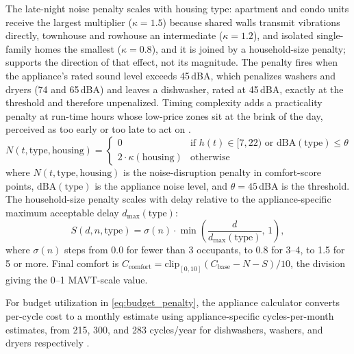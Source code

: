 \documentclass[final,3p,times]{elsarticle}
\begin{document}
The late-night noise penalty scales with housing type: apartment and condo units receive the largest multiplier ($\kappa=1.5$) because shared walls transmit vibrations directly, townhouse and rowhouse an intermediate ($\kappa=1.2$), and isolated single-family homes the smallest ($\kappa=0.8$), and it is joined by a household-size penalty; \citet{waseem2020} supports the direction of that effect, not its magnitude. The penalty fires when the appliance's rated sound level exceeds 45\,dBA, which penalizes washers and dryers (74 and 65\,dBA) and leaves a dishwasher, rated at 45\,dBA, exactly at the threshold and therefore unpenalized. Timing complexity adds a practicality penalty at run-time hours whose low-price zones sit at the brink of the day, perceived as too early or too late to act on \cite{paetz2012}.
\begin{equation}
  N(t,\mathrm{type},\mathrm{housing})=
  \begin{cases}
    0 & \text{if } h(t)\in[7,22) \text{ or } \mathrm{dBA}(\mathrm{type})\le \theta \\[3pt]
    2\cdot \kappa(\mathrm{housing}) & \text{otherwise}
  \end{cases}
  \label{eq:appliance_noise_penalty}
\end{equation}
\noindent where $N(t,\mathrm{type},\mathrm{housing})$ is the noise-disruption penalty in comfort-score points, $\mathrm{dBA}(\mathrm{type})$ is the appliance noise level, and $\theta = 45$\,dBA is the threshold. The household-size penalty scales with delay relative to the appliance-specific maximum acceptable delay $d_{\max}(\mathrm{type})$:
\begin{equation}
  S(d,n,\mathrm{type})=\sigma(n)\cdot \min\!\left(\frac{d}{d_{\max}(\mathrm{type})},\,1\right),
  \label{eq:appliance_size_penalty}
\end{equation}
\noindent where $\sigma(n)$ steps from 0.0 for fewer than 3 occupants, to 0.8 for 3--4, to 1.5 for 5 or more. Final comfort is $C_{\mathrm{comfort}}=\mathrm{clip}_{[0,10]}(C_{\mathrm{base}}-N-S)/10$, the division giving the 0--1 MAVT-scale value.

For budget utilization in \eqref{eq:budget_penalty}, the appliance calculator converts per-cycle cost to a monthly estimate using appliance-specific cycles-per-month estimates, from 215, 300, and 283 cycles/year for dishwashers, washers, and dryers respectively \cite{energystar_dishwasher_criteria2023,energystar_clotheswasher,doe_dryer_tp_2011}.
\end{document}
